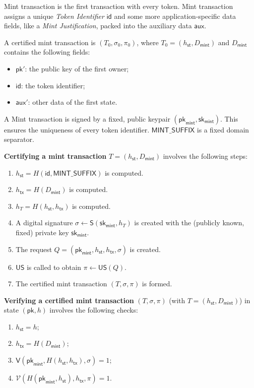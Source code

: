 \documentclass{article}
\newcommand{\sig}[0]{\mathsf{S}}
\newcommand{\sigver}[0]{\mathsf{V}}
\newcommand{\pubkey}[0]{\mathsf{pk}}
\newcommand{\prikey}[0]{\mathsf{sk}}
\newcommand{\unisrv}[0]{\mathsf{US}}
\newcommand{\sthash}[0]{h_\mathsf{st}}
\newcommand{\txhash}[0]{h_\mathsf{tx}}
\newcommand{\auxd}[0]{\mathsf{aux}}
\newcommand{\univer}[0]{\mathcal{V}}
\begin{document}
Mint transaction is the first transaction with every token. Mint transaction assigns a unique \emph{Token Identifier} $\mathsf{id}$ and some more application-specific data fields, like a \emph{Mint Justification}, packed into the auxiliary data $\auxd$.

A certified mint transaction is $(T_0, \sigma_0, \pi_0)$, where $T_0 = (\sthash, D_\mathsf{mint})$ and $D_\mathsf{mint}$ contains the following fields:
\begin{itemize}
    \item $\pubkey'$: the public key of the first owner;
    \item $\mathsf{id}$: the token identifier;
    \item $\auxd'$: other data of the first state.
\end{itemize}

\noindent A Mint transaction is signed by a fixed, public keypair $(\pubkey_\mathsf{mint}, \prikey_\mathsf{mint})$. This ensures the uniqueness of every token identifier. $\mathsf{MINT\_SUFFIX}$ is a fixed domain separator.\medskip

\noindent\textbf{Certifying a mint transaction} $T = (\sthash, D_\mathsf{mint})$ involves the following steps:
\begin{enumerate}
    \item $\sthash = H(\mathsf{id}, \mathsf{MINT\_SUFFIX})$ is computed.
	\item $\txhash = H(D_\mathsf{mint})$ is computed.
	\item $h_T = H(\sthash, \txhash)$ is computed.
	\item A digital signature $\sigma \gets \sig(\prikey_\mathsf{mint}, h_T)$ is created with the (publicly known, fixed) private key $\prikey_\mathsf{mint}$.
	\item The request $Q = (\pubkey_\mathsf{mint},\sthash,\txhash,\sigma)$ is created.
	\item $\unisrv$ is called to obtain $\pi\gets \unisrv(Q)$.
	\item The certified mint transaction $(T,\sigma,\pi)$ is formed.
\end{enumerate}

\noindent\textbf{Verifying a certified mint transaction} $(T,\sigma,\pi)$ (with $T=(\sthash, D_\mathsf{mint})$) in state $(\pubkey,h)$ involves the following checks:
\begin{enumerate}
	\item $\sthash=h$;
	\item $\txhash = H(D_\mathsf{mint})$;
	\item $\sigver(\pubkey_\mathsf{mint}, H(\sthash,\txhash),\sigma)=1$;
	\item $\univer(H(\pubkey_\mathsf{mint},\sthash),\txhash,\pi)=1$.
\end{enumerate}
\end{document}
